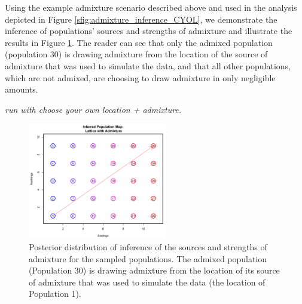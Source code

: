 \documentclass[12pt]{article}
\newcommand{\identifyadmixsource}[1]{{#1^{(*)}}}
\newcommand{\gc}[1]{{\em \color{blue} #1}}
\begin{document}
Using the example admixture scenario described above and used in the analysis depicted in Figure \ref{sfig:admixture_inference_CYOL}, we demonstrate the inference of populations' sources and strengths of admixture and illustrate the results in Figure \ref{sfig:corner_admixture_just_adinf}.  The reader can see that only the admixed population (population 30) is drawing admixture from the location of the source of admixture that was used to simulate the data, and that all other populations, which are not admixed, are choosing to draw admixture in only negligible amounts. \gc{run with choose your own location + admixture.



\begin{figure}[ht!]
	\centering
	\includegraphics[width=2.4in,height=2in]{figs/sims/GeoGenMap_corner_admixture_adinf.png}
	\caption{Posterior distribution of inference of the sources and strengths of admixture for the sampled populations.  The admixed population (Population 30) is drawing admixture from the location of its source of admixture that was used to simulate the data (the location of Population 1).}\label{sfig:corner_admixture_just_adinf}
\end{figure}



}
\end{document}
